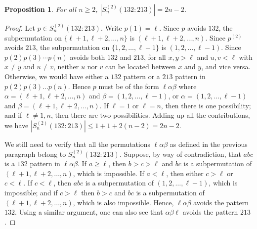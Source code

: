 \documentclass[11pt]{article}
\newtheorem{proposition}[theorem]{Proposition}
\theoremstyle{definition}
\numberwithin{equation}{section}
\begin{document}
\begin{proposition}
    For all $n\geq2$, $|S_n^{(2)}(132:213)|=2n-2$.
\end{proposition}
\begin{proof}
    Let $p\in S_n^{(2)}(132:213)$. Write $p(1)=\ell$. 
Since $p$ avoids $132$, the subpermutation on $\{\ell+1,\ell+2,\ldots,n\}$ is $(\ell+1,\ell+2,\ldots,n)$. 
Since $p^{(2)}$ avoids $213$, the subpermutation on $\{1,2,\ldots,\ell-1\}$ is $(1,2,\ldots,\ell-1)$. Since $p(2)p(3)\cdots p(n)$ avoids both $132$ and $213$, for all $x,y>\ell$ and $u,v<\ell$ with $x\neq y$ and $u\neq v$, neither $u$ nor $v$ can be located between $x$ and $y$, and vice versa. Otherwise, we would have either a $132$ pattern or a $213$ pattern in $p(2)p(3)\ldots p(n)$. Hence $p$ must be of the form $\ell\alpha\beta$ where $\alpha=(\ell+1,\ell+2,\ldots,n)$ and $\beta=(1,2,\ldots,\ell-1)$, or $\alpha=(1,2,\ldots,\ell-1)$ and $\beta=(\ell+1,\ell+2,\ldots,n)$. If $\ell=1$ or $\ell=n$, then there is one possibility; and if $\ell\neq 1,n$, then there are two possibilities. Adding up all the contributions, we have $|S_n^{(2)}(132:213)|\leq 1+1+2(n-2)=2n-2$.

    We still need to verify that all the permutations $\ell\alpha\beta$ as defined in the previous paragraph belong to $S_n^{(2)}(132:213)$. 
Suppose, by way of contradiction, that $abc$ is a $132$ pattern in $\ell\alpha\beta$. If $a\geq\ell$, then $b>c>\ell$ and $bc$ is a subpermutation of $(\ell+1,\ell+2,\ldots,n)$, which is impossible. If $a<\ell$, then either $c>\ell$ or $c<\ell$. If $c<\ell$, then $abc$ is a subpermutation of $(1,2,\ldots,\ell-1)$, which is impossible; and if $c>\ell$ then $b>c$ and $bc$ is a subpermutation of $(\ell+1,\ell+2,\ldots,n)$, which is also impossible. Hence, $\ell\alpha\beta$ avoids the pattern $132$. 
Using a similar argument, one can also see that $\alpha\beta\ell$ avoids the pattern $213$.
\end{proof}
\end{document}
